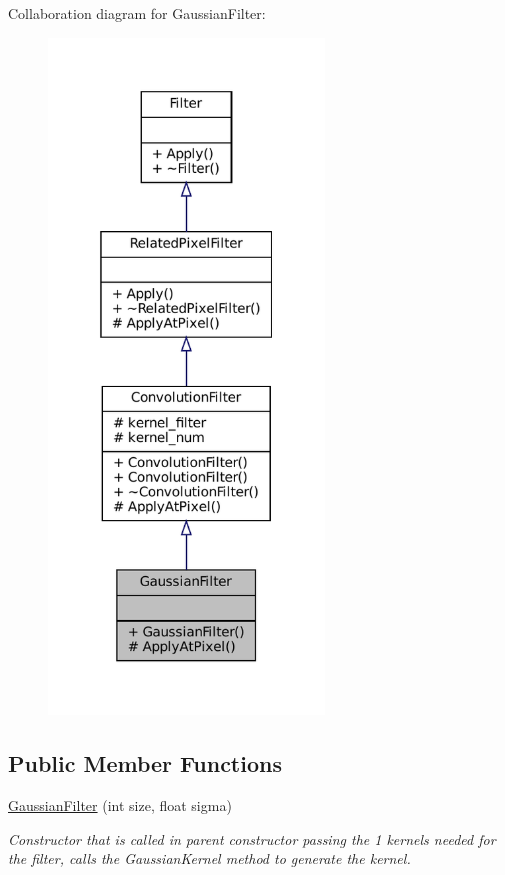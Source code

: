 Collaboration diagram for Gaussian\+Filter\+:\nopagebreak
\begin{figure}[H]
\begin{center}
\leavevmode
\includegraphics[width=208pt]{classGaussianFilter__coll__graph}
\end{center}
\end{figure}
\subsection*{Public Member Functions}
\begin{DoxyCompactItemize}
\item 
\mbox{\label{classGaussianFilter_a45e674167d95fda302e9e2344f8d690c}} 
\hyperlink{classGaussianFilter_a45e674167d95fda302e9e2344f8d690c}{Gaussian\+Filter} (int size, float sigma)
\begin{DoxyCompactList}\small\item\em Constructor that is called in parent constructor passing the 1 kernels needed for the filter, calls the Gaussian\+Kernel method to generate the kernel. \end{DoxyCompactList}\end{DoxyCompactItemize}
